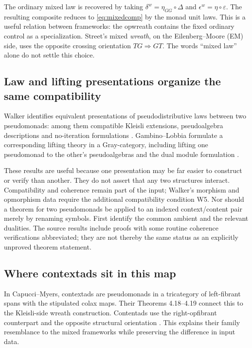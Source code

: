 \documentclass[11pt,letterpaper]{article}
\newcommand{\comp}{\mathbin{\circ}}
\begin{document}
The ordinary mixed law is recovered by taking
$\delta^{w}=\eta_{GG}\comp\Delta$ and
$\epsilon^{w}=\eta\comp\varepsilon$.
The resulting composite reduces to \eqref{eq:mixedcomp} by the monad unit laws. This is a useful relation between frameworks: the opwreath contains the fixed ordinary control as a specialization. Street's mixed \emph{wreath}, on the Eilenberg--Moore (EM) side, uses the opposite crossing orientation $TG\Rightarrow GT$. The words ``mixed law'' alone do not settle this choice.

\subsection{Law and lifting presentations organize the same compatibility}
Walker identifies equivalent presentations of pseudodistributive laws between two pseudomonads: among them compatible Kleisli extensions, pseudoalgebra descriptions and no-iteration formulations \cite[Theorems 4.1.8 and 5.0.1]{Walker}. Gambino--Lobbia formulate a corresponding lifting theory in a Gray-category, including lifting one pseudomonad to the other's pseudoalgebras and the dual module formulation \cite[Theorems 3.4 and 4.5, Corollary 4.6]{GL}.

These results are useful because one presentation may be far easier to construct or verify than another. They do not assert that any two structures interact. Compatibility and coherence remain part of the input; Walker's morphism and opmorphism data require the additional compatibility condition W5. Nor should a theorem for two pseudomonads be applied to an indexed context/content pair merely by renaming symbols. First identify the common ambient and the relevant dualities. The source results include proofs with some routine coherence verifications abbreviated; they are not thereby the same status as an explicitly unproved theorem statement.

\subsection{Where contextads sit in this map}
In Capucci--Myers, contextads are pseudomonads in a tricategory of left-fibrant spans with the stipulated colax maps. Their Theorems 4.18--4.19 connect this to the Kleisli-side wreath construction. Contentads use the right-opfibrant counterpart and the opposite structural orientation \cite[Definition 3.15, Theorems 4.18--4.19, Section 6]{CM}. This explains their family resemblance to the mixed frameworks while preserving the difference in input data.
\end{document}
